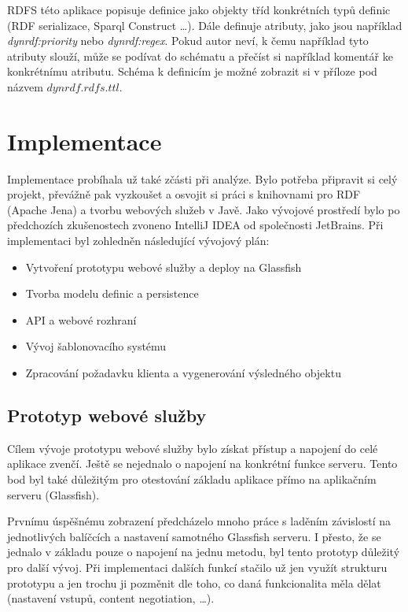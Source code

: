 \documentclass[thesis=B,czech]{FITthesis}[2012/06/26]
\begin{document}
  RDFS této aplikace popisuje definice jako objekty tříd konkrétních typů definic (RDF serializace, Sparql Construct \ldots). Dále definuje atributy, jako jsou
  například \textit{dynrdf:priority} nebo \textit{dynrdf:regex}. Pokud autor neví, k čemu například tyto atributy slouží, může se podívat 
  do schématu a přečíst si například komentář ke konkrétnímu atributu. Schéma k definicím je možné zobrazit si v příloze pod názvem $dynrdf.rdfs.ttl$.
  
  
  
  \chapter{Implementace}
  Implementace probíhala už také zčásti při analýze. Bylo potřeba připravit si celý projekt, převážně pak vyzkoušet a osvojit si práci s knihovnami
  pro RDF (Apache Jena) a tvorbu webových služeb v Javě. Jako vývojové prostředí bylo po předchozích zkušenostech zvoneno IntelliJ IDEA od společnosti 
  JetBrains.
  Při implementaci byl zohledněn následující vývojový plán:
  \begin{itemize}
   \item Vytvoření prototypu webové služby a deploy na Glassfish \cite{glassfish}
   \item Tvorba modelu definic a persistence
   \item API a webové rozhraní
   \item Vývoj šablonovacího systému
   \item Zpracování požadavku klienta a vygenerování výsledného objektu
  \end{itemize}
  
  
  \section{Prototyp webové služby}
  Cílem vývoje prototypu webové služby bylo získat přístup a napojení do celé aplikace zvenčí. Ještě se nejednalo o napojení na konkrétní
  funkce serveru. Tento bod byl také důležitým pro otestování základu aplikace přímo na aplikačním serveru (Glassfish).
  
  Prvnímu úspěšnému zobrazení  předcházelo mnoho práce s laděním závislostí na jednotlivých balíčcích a nastavení samotného
  Glassfish serveru. I přesto, že se jednalo v základu pouze o napojení na jednu metodu, byl tento prototyp důležitý pro další vývoj. 
  Při implementaci dalších funkcí stačilo už jen využít strukturu prototypu a jen trochu ji pozměnit dle toho, co daná funkcionalita měla dělat (nastavení vstupů,
  content negotiation, \ldots).
  
\end{document}
